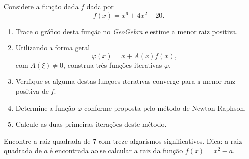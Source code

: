%
%
%
%
%
%
%
%
%
%
%
%
%
%
%
%
%
%


\begin{ex}
Considere a função dada $f$ dada por $$f(x)=x^6+4x^2-20.$$
\begin{enumerate}
\item Trace o gráfico desta função no \emph{GeoGebra}  e estime a menor raiz positiva. 
\item Utilizando a forma geral $$\varphi(x)=x+A(x)f(x),$$ com $A(\xi)\neq 0$, construa três funções iterativas $\varphi$.
\item Verifique se alguma destas funções iterativas converge para a menor raiz positiva de $f$.
\item Determine a função $\varphi$ conforme proposta pelo método de Newton-Raphson.
\item Calcule as duas primeiras iterações deste método.
\end{enumerate}
\end{ex}






\begin{ex}
Encontre a raiz quadrada de 7 com treze algarismos significativos. Dica: a raiz quadrada de $a$ é encontrada ao se calcular a raiz da função $f(x)=x^2-a$.
\end{ex}

